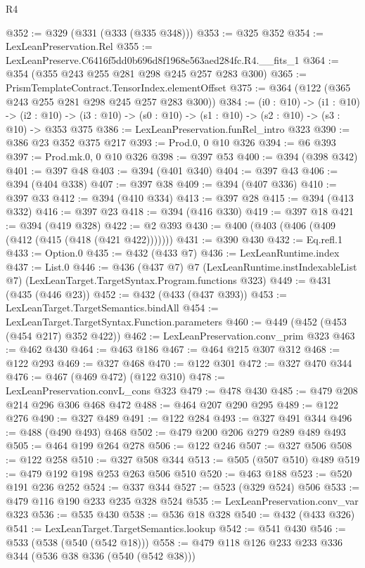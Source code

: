 \begin{lexlean}{R4}
\begin{coremodule}
@352 := @329 (@331 (@333 (@335 @348)))
@353 := @325 @352
@354 := LexLeanPreservation.Rel
@355 := LexLeanPreserve.C6416f5dd0b696d8f1968e563aed284fc.R4.__fits_1
@364 := @354 (@355 @243 @255 @281 @298 @245 @257 @283 @300)
@365 := PrismTemplateContract.TensorIndex.elementOffset
@375 := @364 (@122 (@365 @243 @255 @281 @298 @245 @257 @283 @300))
@384 := (i0 : @10) ->
  (i1 : @10) ->
  (i2 : @10) -> (i3 : @10) -> (s0 : @10) -> (s1 : @10) -> (s2 : @10) -> (s3 : @10) -> @353 @375
@386 := LexLeanPreservation.funRel_intro @323
@390 := @386 @23 @352 @375 @217
@393 := Prod.{0, 0} @10 @326
@394 := @6 @393
@397 := Prod.mk.{0, 0} @10 @326
@398 := @397 @53
@400 := @394 (@398 @342)
@401 := @397 @48
@403 := @394 (@401 @340)
@404 := @397 @43
@406 := @394 (@404 @338)
@407 := @397 @38
@409 := @394 (@407 @336)
@410 := @397 @33
@412 := @394 (@410 @334)
@413 := @397 @28
@415 := @394 (@413 @332)
@416 := @397 @23
@418 := @394 (@416 @330)
@419 := @397 @18
@421 := @394 (@419 @328)
@422 := @2 @393
@430 := @400 (@403 (@406 (@409 (@412 (@415 (@418 (@421 @422)))))))
@431 := @390 @430
@432 := Eq.refl.{1}
@433 := Option.{0}
@435 := @432 (@433 @7)
@436 := LexLeanRuntime.index
@437 := List.{0}
@446 := @436
    (@437 @7)
    @7
    (LexLeanRuntime.instIndexableList @7)
    (LexLeanTarget.TargetSyntax.Program.functions @323)
@449 := @431 (@435 (@446 @23))
@452 := @432 (@433 (@437 @393))
@453 := LexLeanTarget.TargetSemantics.bindAll
@454 := LexLeanTarget.TargetSyntax.Function.parameters
@460 := @449 (@452 (@453 (@454 @217) @352 @422))
@462 := LexLeanPreservation.conv_prim @323
@463 := @462 @430
@464 := @463 @186
@467 := @464 @215 @307 @312
@468 := @122 @293
@469 := @327 @468
@470 := @122 @301
@472 := @327 @470 @344
@476 := @467 (@469 @472) (@122 @310)
@478 := LexLeanPreservation.convL_cons @323
@479 := @478 @430
@485 := @479 @208 @214 @296 @306 @468 @472
@488 := @464 @207 @290 @295
@489 := @122 @276
@490 := @327 @489
@491 := @122 @284
@493 := @327 @491 @344
@496 := @488 (@490 @493) @468
@502 := @479 @200 @206 @279 @289 @489 @493
@505 := @464 @199 @264 @278
@506 := @122 @246
@507 := @327 @506
@508 := @122 @258
@510 := @327 @508 @344
@513 := @505 (@507 @510) @489
@519 := @479 @192 @198 @253 @263 @506 @510
@520 := @463 @188
@523 := @520 @191 @236 @252
@524 := @337 @344
@527 := @523 (@329 @524) @506
@533 := @479 @116 @190 @233 @235 @328 @524
@535 := LexLeanPreservation.conv_var @323
@536 := @535 @430
@538 := @536 @18 @328
@540 := @432 (@433 @326)
@541 := LexLeanTarget.TargetSemantics.lookup
@542 := @541 @430
@546 := @533 (@538 (@540 (@542 @18)))
@558 := @479 @118 @126 @233 @233 @336 @344 (@536 @38 @336 (@540 (@542 @38)))

\end{coremodule}
\end{lexlean}

